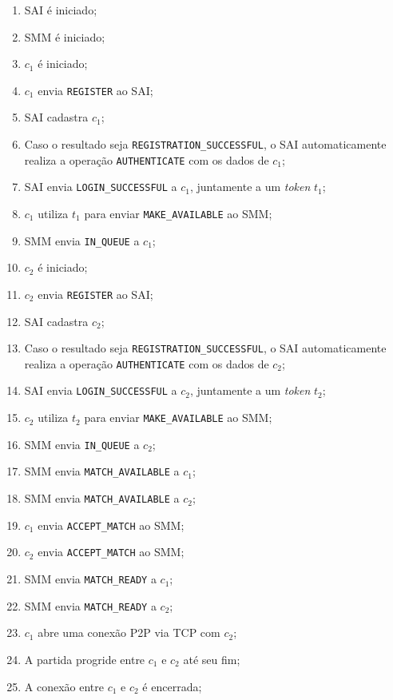 \documentclass{article}
\begin{document}
\begin{multicols}{2}
    \begin{enumerate}
      \item SAI é iniciado;
      \item SMM é iniciado;
      \item $c_1$ é iniciado;
      \item $c_1$ envia \texttt{REGISTER} ao SAI;
      \item SAI cadastra $c_1$;
      \item Caso o resultado seja \texttt{REGISTRATION\_SUCCESSFUL}, o SAI automaticamente realiza a operação \texttt{AUTHENTICATE} com os dados de $c_1$;
      \item SAI envia \texttt{LOGIN\_SUCCESSFUL} a $c_1$, juntamente a um \textit{token} $t_1$;
      \item $c_1$ utiliza $t_1$ para enviar \texttt{MAKE\_AVAILABLE} ao SMM;
      \item SMM envia \texttt{IN\_QUEUE} a $c_1$;
      \item $c_2$ é iniciado;
      \item $c_2$ envia \texttt{REGISTER} ao SAI;
      \item SAI cadastra $c_2$;
      \item Caso o resultado seja \texttt{REGISTRATION\_SUCCESSFUL}, o SAI automaticamente realiza a operação \texttt{AUTHENTICATE} com os dados de $c_2$;
      \item SAI envia \texttt{LOGIN\_SUCCESSFUL} a $c_2$, juntamente a um \textit{token} $t_2$;
      \item $c_2$ utiliza $t_2$ para enviar \texttt{MAKE\_AVAILABLE} ao SMM;
      \item SMM envia \texttt{IN\_QUEUE} a $c_2$;
      \item SMM envia \texttt{MATCH\_AVAILABLE} a $c_1$;
      \item SMM envia \texttt{MATCH\_AVAILABLE} a $c_2$;
      \item $c_1$ envia \texttt{ACCEPT\_MATCH} ao SMM;
      \item $c_2$ envia \texttt{ACCEPT\_MATCH} ao SMM;
      \item SMM envia \texttt{MATCH\_READY} a $c_1$;
      \item SMM envia \texttt{MATCH\_READY} a $c_2$;
      \item $c_1$ abre uma conexão P2P via TCP com $c_2$;
      \item A partida progride entre $c_1$ e $c_2$ até seu fim;
      \item A conexão entre $c_1$ e $c_2$ é encerrada;

\end{enumerate}
\end{multicols}
\end{document}
